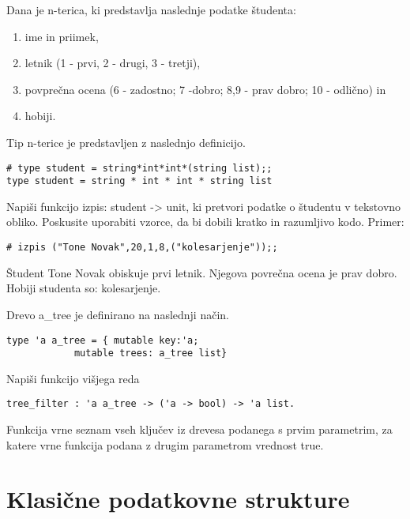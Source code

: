\begin{ex}
Dana je n-terica, ki predstavlja naslednje podatke \v studenta:
\begin{enumerate}
\item ime in priimek,
\item letnik (1 - prvi, 2 - drugi, 3 - tretji),
\item povpre\v cna ocena (6 - zadostno; 7 -dobro; 8,9 - prav dobro; 10 - odli\v cno) in
\item hobiji.
\end{enumerate}

Tip n-terice je predstavljen z naslednjo definicijo.

\begin{lstlisting}
# type student = string*int*int*(string list);;
type student = string * int * int * string list
\end{lstlisting}

Napi\v si funkcijo izpis: student -> unit, ki pretvori podatke o \v studentu v tekstovno obliko. Poskusite uporabiti vzorce, da bi dobili kratko in razumljivo kodo.
Primer: 
\begin{lstlisting}
# izpis ("Tone Novak",20,1,8,("kolesarjenje"));; 
\end{lstlisting}
\v Student Tone Novak obiskuje prvi letnik. 
Njegova povre\v cna ocena je prav dobro.
Hobiji studenta so: kolesarjenje.
\end{ex}
\begin{ex}
  Drevo a\_tree je definirano na naslednji na\v cin.

\begin{lstlisting}
type 'a a_tree = { mutable key:'a; 
            mutable trees: a_tree list}
\end{lstlisting}

  Napi\v si funkcijo vi\v sjega reda

\begin{lstlisting}
tree_filter : 'a a_tree -> ('a -> bool) -> 'a list.
\end{lstlisting}

  Funkcija vrne seznam vseh klju\v cev iz drevesa podanega s prvim
  parametrim, za katere vrne funkcija podana z drugim parametrom
  vrednost true.


\end{ex} 

\section{Klasi\v cne podatkovne strukture}

